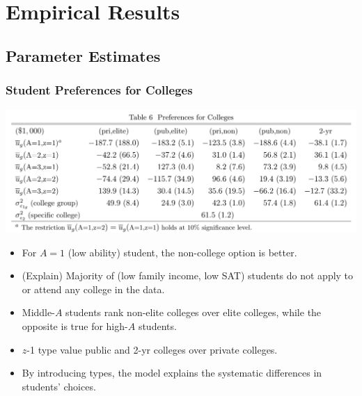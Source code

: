 \documentclass[10pt]{beamer}
\begin{document}
\section[Results]{Empirical Results}
\subsection{Parameter Estimates}
\begin{frame}[c]\frametitle{Student Preferences for Colleges}

\centerline{\includegraphics[width=\textwidth]{table6.png}}
\begin{itemize}
\small
    \item  For $A=1$ (low ability) student, the non-college option is better.
    \item  (Explain) Majority of (low family income, low SAT) students do not apply to or attend any college in the data.
    \item Middle-$A$ students rank non-elite colleges over elite colleges, while the opposite is true for high-$A$ students.
    \item  $z$-1 type value public and 2-yr colleges over private colleges.
    \item By introducing types, the model explains the systematic differences in students' choices.
\end{itemize}


\end{frame}
\end{document}
